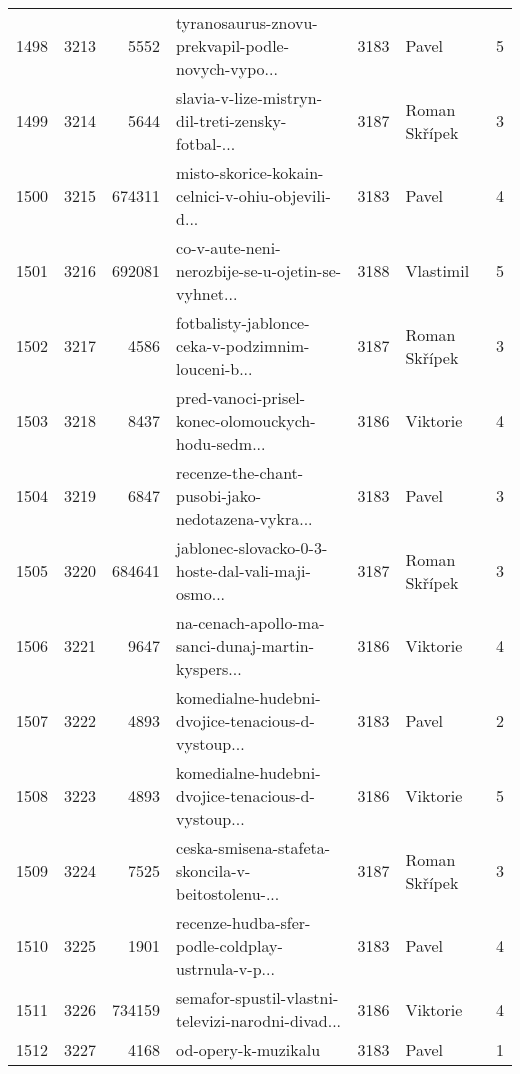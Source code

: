 \begin{tabular}{lrrlrlr}
1498 &       3213 &     5552 &  tyranosaurus-znovu-prekvapil-podle-novych-vypo... &     3183 &                        Pavel &               5 \\
1499 &       3214 &     5644 &  slavia-v-lize-mistryn-dil-treti-zensky-fotbal-... &     3187 &                Roman Skřípek &               3 \\
1500 &       3215 &   674311 &  misto-skorice-kokain-celnici-v-ohiu-objevili-d... &     3183 &                        Pavel &               4 \\
1501 &       3216 &   692081 &  co-v-aute-neni-nerozbije-se-u-ojetin-se-vyhnet... &     3188 &                    Vlastimil &               5 \\
1502 &       3217 &     4586 &  fotbalisty-jablonce-ceka-v-podzimnim-louceni-b... &     3187 &                Roman Skřípek &               3 \\
1503 &       3218 &     8437 &  pred-vanoci-prisel-konec-olomouckych-hodu-sedm... &     3186 &                     Viktorie &               4 \\
1504 &       3219 &     6847 &  recenze-the-chant-pusobi-jako-nedotazena-vykra... &     3183 &                        Pavel &               3 \\
1505 &       3220 &   684641 &  jablonec-slovacko-0-3-hoste-dal-vali-maji-osmo... &     3187 &                Roman Skřípek &               3 \\
1506 &       3221 &     9647 &  na-cenach-apollo-ma-sanci-dunaj-martin-kyspers... &     3186 &                     Viktorie &               4 \\
1507 &       3222 &     4893 &  komedialne-hudebni-dvojice-tenacious-d-vystoup... &     3183 &                        Pavel &               2 \\
1508 &       3223 &     4893 &  komedialne-hudebni-dvojice-tenacious-d-vystoup... &     3186 &                     Viktorie &               5 \\
1509 &       3224 &     7525 &  ceska-smisena-stafeta-skoncila-v-beitostolenu-... &     3187 &                Roman Skřípek &               3 \\
1510 &       3225 &     1901 &  recenze-hudba-sfer-podle-coldplay-ustrnula-v-p... &     3183 &                        Pavel &               4 \\
1511 &       3226 &   734159 &  semafor-spustil-vlastni-televizi-narodni-divad... &     3186 &                     Viktorie &               4 \\
1512 &       3227 &     4168 &                                od-opery-k-muzikalu &     3183 &                        Pavel &               1 \\

\end{tabular}
